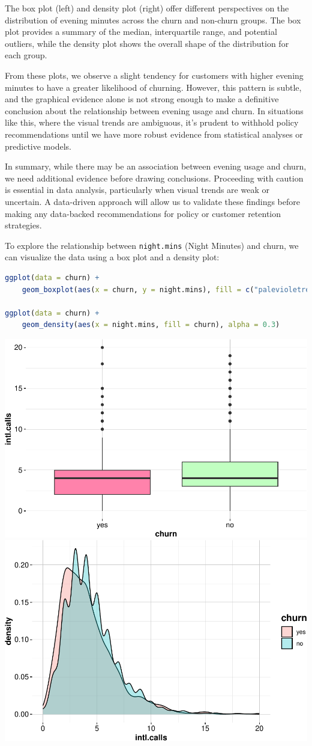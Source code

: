 \documentclass[
]{book}
\newcommand{\passthrough}[1]{#1}
\theoremstyle{definition}
\theoremstyle{definition}
\theoremstyle{definition}
\theoremstyle{definition}
\theoremstyle{remark}
\begin{document}
The box plot (left) and density plot (right) offer different perspectives on the distribution of evening minutes across the churn and non-churn groups. The box plot provides a summary of the median, interquartile range, and potential outliers, while the density plot shows the overall shape of the distribution for each group.

From these plots, we observe a slight tendency for customers with higher evening minutes to have a greater likelihood of churning. However, this pattern is subtle, and the graphical evidence alone is not strong enough to make a definitive conclusion about the relationship between evening usage and churn. In situations like this, where the visual trends are ambiguous, it's prudent to withhold policy recommendations until we have more robust evidence from statistical analyses or predictive models.

In summary, while there may be an association between evening usage and churn, we need additional evidence before drawing conclusions. Proceeding with caution is essential in data analysis, particularly when visual trends are weak or uncertain. A data-driven approach will allow us to validate these findings before making any data-backed recommendations for policy or customer retention strategies.

To explore the relationship between \passthrough{\lstinline!night.mins!} (Night Minutes) and churn, we can visualize the data using a box plot and a density plot:

\begin{lstlisting}[language=R]
ggplot(data = churn) +
    geom_boxplot(aes(x = churn, y = night.mins), fill = c("palevioletred1", "darkseagreen1"))

ggplot(data = churn) +
    geom_density(aes(x = night.mins, fill = churn), alpha = 0.3)
\end{lstlisting}

\includegraphics[width=0.5\linewidth]{EDA_files/figure-latex/unnamed-chunk-14-1} \includegraphics[width=0.5\linewidth]{EDA_files/figure-latex/unnamed-chunk-14-2}
\end{document}
